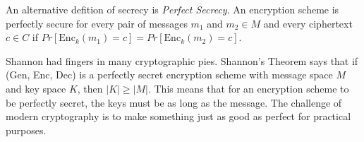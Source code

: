 An alternative defition of secrecy is 
\emph{Perfect Secrecy}. An encryption
scheme is perfectly secure for every 
pair of messages $m_1$ and $m_2 \in M$
and every ciphertext $c\in C$ if 
$Pr[\text{Enc}_k(m_1)=c]=Pr[\text{Enc}_k(m_2)=c]$.

Shannon had fingers in many cryptographic pies. 
Shannon's Theorem says that if 
(Gen, Enc, Dec) is a perfectly secret 
encryption scheme with message space $M$ 
and key space $K$, then $|K| \geq |M|$. 
This means that for an encryption scheme 
to be perfectly secret, the keys must 
be as long as the message. The challenge of 
modern cryptography is to make something 
just as good as perfect for practical purposes. 